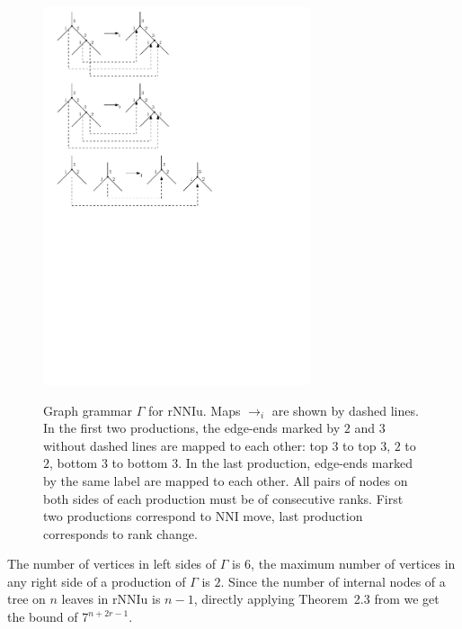 \documentclass{amsart}
\theoremstyle{definition}
\newcommand{\nni}{\mathrm{NNI}}
\newcommand{\rnniu}{\mathrm{rNNIu}}
\begin{document}
\begin{figure}
\centering
\includegraphics[width=0.7\textwidth]{grammar_rNNIu.pdf}
\label{grammar_rNNIu.pdf}
\caption{Graph grammar $\Gamma$ for $\rnniu$.
Maps $\to_i$ are shown by dashed lines.
In the first two productions, the edge-ends marked by $2$ and $3$ without dashed lines are mapped to each other: top $3$ to top $3$, $2$ to $2$, bottom $3$ to bottom $3$.
In the last production, edge-ends marked by the same label are mapped to each other.
All pairs of nodes on both sides of each production must be of consecutive ranks.
First two productions correspond to $\nni$ move, last production corresponds to rank change.}
\end{figure}

The number of vertices in left sides of $\Gamma$ is $6$, the maximum number of vertices in any right side of a production of $\Gamma$ is $2$.
Since the number of internal nodes of a tree on $n$ leaves in $\rnniu$ is $n-1$, directly applying Theorem~2.3 from \autocite{Sleator1992-bp} we get the bound of $7^{n+2r-1}$.
\end{document}
